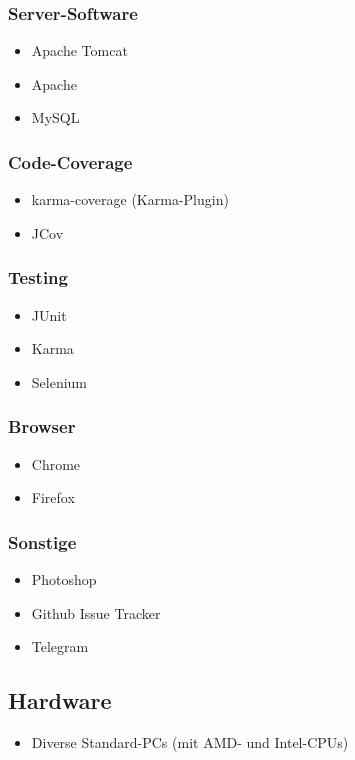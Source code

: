 	\subsubsection{Server-Software}
		\begin{itemize}
			\item Apache Tomcat
			\item Apache
			\item MySQL
		\end{itemize}
	\subsubsection{Code-Coverage}
		\begin{itemize}
			\item karma-coverage (Karma-Plugin)
			\item JCov
		\end{itemize}
	\subsubsection{Testing}
		\begin{itemize}
			\item JUnit
			\item Karma
			\item Selenium
		\end{itemize}
	\subsubsection{Browser}
	\begin{itemize}
		\item Chrome
		\item Firefox
	\end{itemize}
	\subsubsection{Sonstige}
		\begin{itemize}
			\item Photoshop
			\item Github Issue Tracker
			\item Telegram
		\end{itemize}
\subsection{Hardware}
		\begin{itemize}
			\item Diverse Standard-PCs (mit AMD- und Intel-CPUs)
		\end{itemize}
